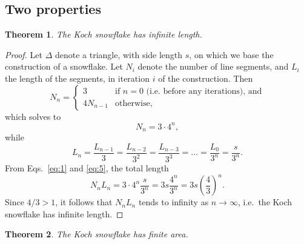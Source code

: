 \documentclass[12pt,a4paper]{article}
\newtheorem{theorem}{Theorem}
\begin{document}
	\subsection{Two properties}
	\begin{theorem}
	 	\textit{The Koch snowflake has infinite length.}
	\end{theorem}
	\begin{proof}
	 Let $\Delta$ denote a triangle, with side length $s$, on which we base the construction of a snowflake. Let $N_i$ denote the number of line segments, and $L_i$ the length of the 				segments, in iteration $i$ of the construction. Then    	
		\begin{displaymath}
			  N_n =
			    \begin{cases}
			      3             & \text{if $n=0$ (i.e.\ before any iterations), and} \\
			     4 N_{n-1}		& \text{otherwise,}
			    \end{cases}
		\end{displaymath}
		which solves to 
		\begin{equation}
		 	\label{eq:1}
		  	 N_n=3\cdot 4^n,
		\end{equation}
		while  
		\begin{equation}
		  \label{eq:5}
		   L_n=\frac{L_{n-1}}{3}=\frac{L_{n-2}}{3^2}=\frac{L_{n-3}}{3^3}=\ldots=\frac{L_0}{3^n}=\frac{s}{3^n}.
		\end{equation}
		From Eqs.~\ref{eq:1} and \ref{eq:5}, the total length 
		\begin{displaymath} 
			  N_nL_n=3\cdot4^n\frac{s}{3^n}=3s\frac{4^n}{3^n}=3s\left(\frac{4}{3}\right)^n.
		\end{displaymath}	
		Since $4/3>1$, it follows that $N_n L_n$ tends to infinity as $n \to \infty$, i.e.\ the Koch snowflake has infinite length.
	\end{proof}
	\begin{theorem}
	The Koch snowflake has finite area.
	\end{theorem}
\end{document}
